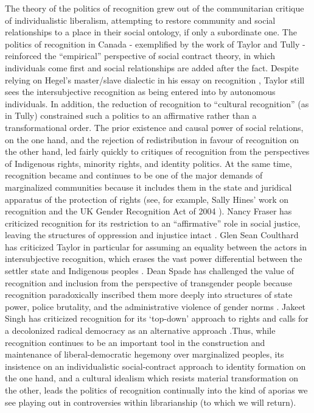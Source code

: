 \documentclass[12pt,oneside]{memoir}
\begin{document}
The theory of the politics of recognition grew out of the communitarian critique of individualistic liberalism, attempting to restore community and social relationships to a place in their social ontology, if only a subordinate one. The politics of recognition in Canada - exemplified by the work of Taylor and Tully - reinforced the ``empirical'' perspective of social contract theory, in which individuals come first and social relationships are added after the fact. Despite relying on Hegel's master/slave dialectic in his essay on recognition \citep{Taylor1992}, Taylor still sees the intersubjective recognition as being entered into by autonomous individuals. In addition, the reduction of recognition to ``cultural recognition'' (as in Tully) constrained such a politics to an affirmative rather than a transformational order.
The prior existence and causal power of social relations, on the one hand, and the rejection of redistribution in favour of recognition on the other hand, led fairly quickly to critiques of recognition from the perspectives of Indigenous rights, minority rights, and identity politics. At the same time, recognition became and continues to be one of the major demands of marginalized communities because it includes them in the state and juridical apparatus of the protection of rights (see, for example, Sally Hines' work on recognition and the UK Gender Recognition Act of 2004 \citep{Hines2013}). Nancy Fraser has criticized recognition for its restriction to an ``affirmative'' role in social justice, leaving the structures of oppression and injustice intact \citep{fraser-justice, fraser-honneth}. Glen Sean Coulthard has criticized Taylor in particular for assuming an equality between the actors in intersubjective recognition, which erases the vast power differential between the settler state and Indigenous peoples \citep{coulthard2014}. Dean Spade has challenged the value of recognition and inclusion from the perspective of transgender people because recognition paradoxically inscribed them more deeply into structures of state power, police brutality, and the administrative violence of gender norms \citep{Spade2015}. Jakeet Singh has criticized recognition for its `top-down' approach to rights \citep{singh-recognition} and calls for a decolonized radical democracy as an alternative approach \citep{singh-democracy}.Thus, while recognition continues to be an important tool in the construction and maintenance of liberal-democratic hegemony over marginalized peoples, its insistence on an individualistic social-contract approach to identity formation on the one hand, and a cultural idealism which resists material transformation on the other, leads the politics of recognition continually into the kind of aporias we see playing out in controversies within librarianship (to which we will return).
\end{document}
